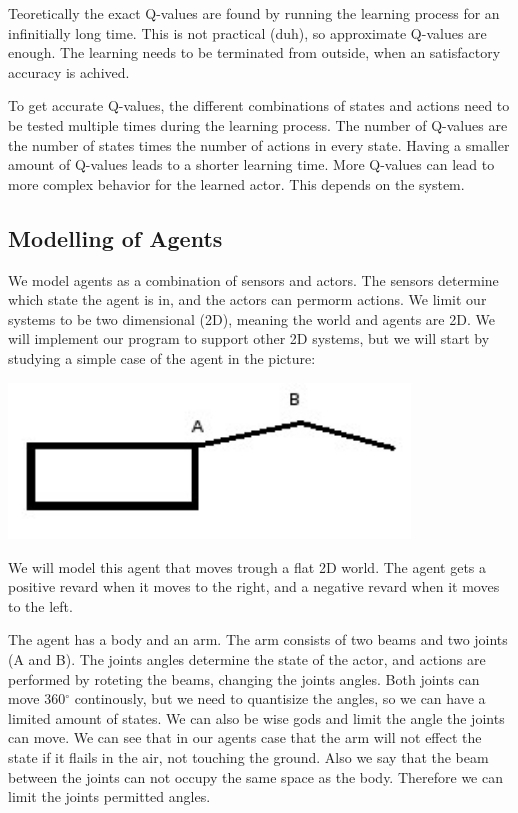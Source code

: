 \documentclass{article}
\begin{document}
Teoretically the exact Q-values are found by running the learning process
for an infinitially long time. This is not practical (duh), so approximate
Q-values are enough. The learning needs to be terminated from outside, when an
satisfactory accuracy is achived.

To get accurate Q-values, the different combinations of states and actions
need to be tested multiple times during the learning process.
The number of Q-values are the number of states times the number of actions
in every state. Having a smaller amount of Q-values leads to a shorter learning
time. More Q-values can lead to more complex behavior for the learned actor.
This depends on the system.


\subsection{Modelling of Agents}
We model agents as a combination of sensors and actors. The sensors determine
which state the agent is in, and the actors can permorm actions.
We limit our systems to be two dimensional (2D), meaning the world and agents
are 2D. We will implement our program to support other 2D systems, but we
will start by studying a simple case of the agent in the picture:

\includegraphics[width=0.8\textwidth]{simple_agent}

We will model this agent that moves trough a flat 2D world.
The agent gets a positive revard when it moves to the right, and a negative
revard when it moves to the left.

The agent has a body and an arm. The arm consists of two beams and two joints
(A and B). The joints angles determine the state of the actor, and actions are
performed by roteting the beams, changing the joints angles.
Both joints can move 360$^\circ$ continously, but we need to quantisize
the angles, so we can have a limited amount of states. We can also be wise
gods and limit the angle the joints can move. We can see that in our agents
case that the arm will not effect the state if it flails in the air, not
touching the ground. Also we say that the beam between the joints can not
occupy the same space as the body. Therefore we can limit the joints
permitted angles.
\end{document}
